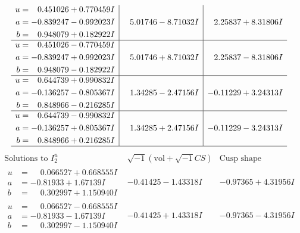 \documentclass[1p]{elsarticle_modified}
\theoremstyle{definition}
\newcommand{\I}{\sqrt{-1}}
\begin{document}
$$\begin{array}{c|c|c}
\begin{aligned}
u &= \phantom{-}0.451026 + 0.770459 I \\
a &= -0.839247 - 0.992023 I \\
b &= \phantom{-}0.948079 + 0.182922 I\end{aligned}
 & \phantom{-}5.01746 - 8.71032 I & \phantom{-}2.25837 + 8.31806 I \\ \hline\begin{aligned}
u &= \phantom{-}0.451026 - 0.770459 I \\
a &= -0.839247 + 0.992023 I \\
b &= \phantom{-}0.948079 - 0.182922 I\end{aligned}
 & \phantom{-}5.01746 + 8.71032 I & \phantom{-}2.25837 - 8.31806 I \\ \hline\begin{aligned}
u &= \phantom{-}0.644739 + 0.990832 I \\
a &= -0.136257 - 0.805367 I \\
b &= \phantom{-}0.848966 - 0.216285 I\end{aligned}
 & \phantom{-}1.34285 - 2.47156 I & -0.11229 + 3.24313 I \\ \hline\begin{aligned}
u &= \phantom{-}0.644739 - 0.990832 I \\
a &= -0.136257 + 0.805367 I \\
b &= \phantom{-}0.848966 + 0.216285 I\end{aligned}
 & \phantom{-}1.34285 + 2.47156 I & -0.11229 - 3.24313 I\\
 \hline 
 \end{array}$$\newpage$$\begin{array}{c|c|c}  
\text{Solutions to }I^u_{2}& \I (\text{vol} + \sqrt{-1}CS) & \text{Cusp shape}\\
 \hline 
\begin{aligned}
u &= \phantom{-}0.066527 + 0.668555 I \\
a &= -0.81933 + 1.67139 I \\
b &= \phantom{-}0.302997 + 1.150940 I\end{aligned}
 & -0.41425 - 1.43318 I & -0.97365 + 4.31956 I \\ \hline\begin{aligned}
u &= \phantom{-}0.066527 - 0.668555 I \\
a &= -0.81933 - 1.67139 I \\
b &= \phantom{-}0.302997 - 1.150940 I\end{aligned}
 & -0.41425 + 1.43318 I & -0.97365 - 4.31956 I \\ \hline\begin{aligned}

\end{aligned}
\end{array}$$
\end{document}

